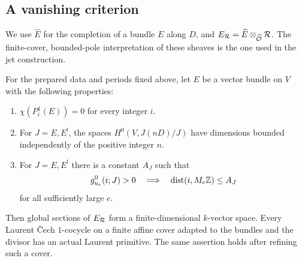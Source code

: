 \subsection{A vanishing criterion}

We use $\widehat E$ for the completion of a bundle $E$ along $D$,
and $E_{\mathcal R}=\widehat E\otimes_{\widehat{\mathcal O}}\mathcal R$.
The finite-cover, bounded-pole interpretation of these sheaves is
the one used in the jet construction.

\begin{theorem}\label{thm:laurent-vanishing}
For the prepared data and periods fixed above, let $E$ be a vector
bundle on $V$ with the following properties:
\begin{enumerate}[label=\textup{(\roman*)}]
\item $\chi(P_i^1(E))=0$ for every integer $i$.
\item For $J=E,E^!$, the spaces $H^0(V,J(nD)/J)$ have dimensions
bounded independently of the positive integer $n$.
\item For $J=E,E^!$ there is a constant $A_J$ such that
\[
 g^0_{u_e}(i;J)>0\quad\Longrightarrow\quad
 \operatorname{dist}(i,M_e\mathbb Z)\le A_J
\]
for all sufficiently large $e$.
\end{enumerate}
Then global sections of $E_{\mathcal R}$ form a finite-dimensional
$k$-vector space.  Every Laurent \v Cech $1$-cocycle on a finite
affine cover adapted to the bundles and the divisor has an actual
Laurent primitive.  The same assertion holds after refining such a
cover.
\end{theorem}

